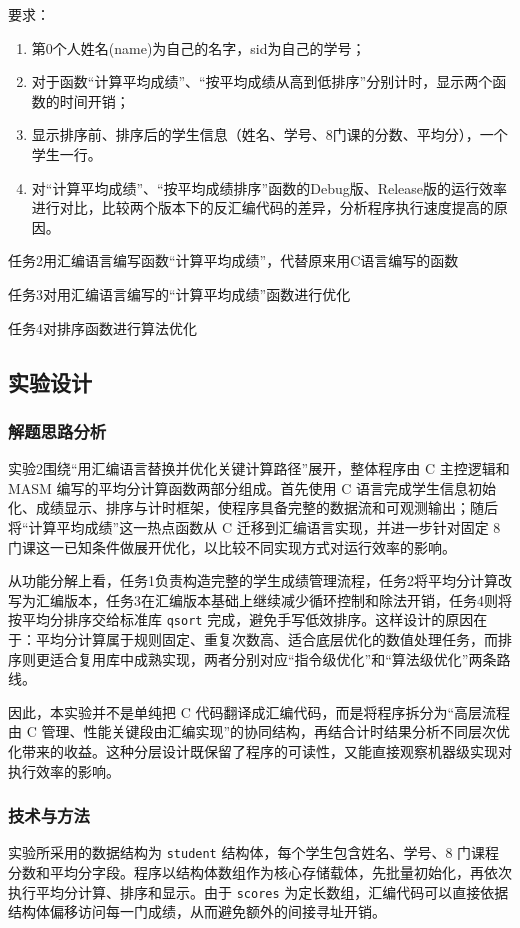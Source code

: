 \documentclass[supercite]{Experimental_Report}
\theoremstyle{definition}
\begin{document}
要求：
\begin{enumerate}
  \item 第0个人姓名(name)为自己的名字，sid为自己的学号；
  \item 对于函数“计算平均成绩”、“按平均成绩从高到低排序”分别计时，显示两个函数的时间开销；
  \item 显示排序前、排序后的学生信息（姓名、学号、8门课的分数、平均分），一个学生一行。
  \item 对“计算平均成绩”、“按平均成绩排序”函数的Debug版、Release版的运行效率进行对比，比较两个版本下的反汇编代码的差异，分析程序执行速度提高的原因。
\end{enumerate}

任务2\quad 用汇编语言编写函数“计算平均成绩”，代替原来用C语言编写的函数

任务3\quad 对用汇编语言编写的“计算平均成绩”函数进行优化

任务4\quad 对排序函数进行算法优化

\subsection{实验设计}
\subsubsection{解题思路分析}
实验2围绕“用汇编语言替换并优化关键计算路径”展开，整体程序由 C 主控逻辑和 MASM 编写的平均分计算函数两部分组成。首先使用 C 语言完成学生信息初始化、成绩显示、排序与计时框架，使程序具备完整的数据流和可观测输出；随后将“计算平均成绩”这一热点函数从 C 迁移到汇编语言实现，并进一步针对固定 8 门课这一已知条件做展开优化，以比较不同实现方式对运行效率的影响。

从功能分解上看，任务1负责构造完整的学生成绩管理流程，任务2将平均分计算改写为汇编版本，任务3在汇编版本基础上继续减少循环控制和除法开销，任务4则将按平均分排序交给标准库 \texttt{qsort} 完成，避免手写低效排序。这样设计的原因在于：平均分计算属于规则固定、重复次数高、适合底层优化的数值处理任务，而排序则更适合复用库中成熟实现，两者分别对应“指令级优化”和“算法级优化”两条路线。

因此，本实验并不是单纯把 C 代码翻译成汇编代码，而是将程序拆分为“高层流程由 C 管理、性能关键段由汇编实现”的协同结构，再结合计时结果分析不同层次优化带来的收益。这种分层设计既保留了程序的可读性，又能直接观察机器级实现对执行效率的影响。

\subsubsection{技术与方法}
实验所采用的数据结构为 \texttt{student} 结构体，每个学生包含姓名、学号、8 门课程分数和平均分字段。程序以结构体数组作为核心存储载体，先批量初始化，再依次执行平均分计算、排序和显示。由于 \texttt{scores} 为定长数组，汇编代码可以直接依据结构体偏移访问每一门成绩，从而避免额外的间接寻址开销。
\end{document}
